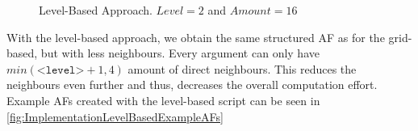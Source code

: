 \begin{figure}[h!]
    \centering
    \caption{Level-Based Approach. $Level=2$ and $Amount=16$}
    \label{fig:LevelBasedApproach}
\end{figure}


With the level-based approach, we obtain the same structured AF as for the grid-based, but with less neighbours. Every argument can only have $min(\texttt{<level>}+1, 4)$ amount of direct neighbours. This reduces the neighbours even further and thus, decreases the overall computation effort. Example AFs created with the level-based script can be seen in \cref{fig:ImplementationLevelBasedExampleAFs}



